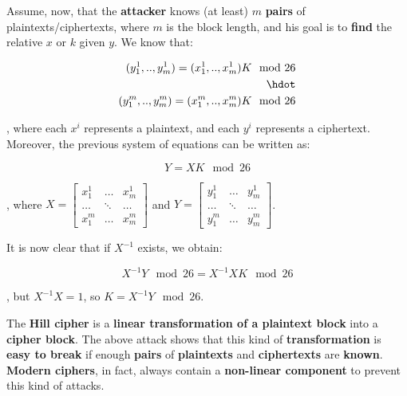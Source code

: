 Assume, now, that the \textbf{attacker} knows (at least) $m$ \textbf{pairs} of plaintexts/ciphertexts, where $m$ is the block length, and his goal is to \textbf{find} the relative $x$ or $k$ given $y$. We know that:

\begin{align*}
    (y_1^1, .., y_m^1) = (x_1^1, .., x_m^1) K \mod 26 \\ 
    \hdot \\
(y_1^m, .., y_m^m) = (x_1^m, .., x_m^m) K \mod 26
\end{align*}

, where each $x^i$ represents a plaintext, and each $y^i$ represents a ciphertext. Moreover, the previous system of equations can be written as:

$$
Y = XK \mod 26
$$

, where $X = \begin{bmatrix}
x_1^1 & \hdots & x_m^1 \\
\hdots & \ddots & \hdots \\
x_1^m & \hdots & x_m^m
\end{bmatrix}$ and $Y = \begin{bmatrix}
y_1^1 & \hdots & y_m^1 \\
\hdots & \ddots & \hdots \\
y_1^m & \hdots & y_m^m
\end{bmatrix}$. 

It is now clear that if $X^{-1}$ exists, we obtain:

$$
X^{-1}Y \mod 26 = X^{-1} X K \mod 26
$$

, but $X^{-1}X = 1$, so $K = X^{-1}Y \mod26$.

The \textbf{Hill cipher} is a \textbf{linear transformation of a plaintext block} into a \textbf{cipher block}. The above attack shows that this kind of \textbf{transformation} is \textbf{easy to break} if enough \textbf{pairs} of \textbf{plaintexts} and \textbf{ciphertexts} are \textbf{known}. \textbf{Modern ciphers}, in fact, always contain a \textbf{non-linear component} to prevent this kind of attacks.


